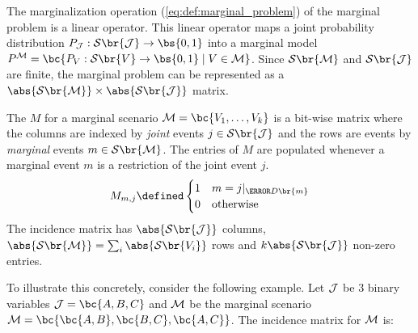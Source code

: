 \documentclass[aps, 10pt, english, twoside, pra, nofootinbib, tightenlines, longbibliography, superscriptaddress]{revtex4-1}
\renewcommand{\Events}[1]{\mathcal{S}\br{#1}} %
\begin{document}
    The marginalization operation (\cref{eq:def:marginal_problem}) of the marginal problem is a linear operator. This linear operator maps a joint probability distribution $\prob[\jointvar] : \Events{\jointvar} \to \bs{0,1}$ into a marginal model $\prob^{\mscenario} = \bc{\prob[V] : \Events{V} \to \bs{0,1} \mid V \in \mscenario}$. Since $\Events{\mscenario}$ and $\Events{\jointvar}$ are finite, the marginal problem can be represented as a $\abs{\Events{\mscenario}} \times \abs{\Events{\jointvar}}$ matrix.

    \begin{definition}
        \label{def:incidence_matrix}
        The  $M$ for a marginal scenario $\mscenario = \bc{V_1, \dots, V_k}$ is a bit-wise matrix where the columns are indexed by \textit{joint} events $j \in \Events{\jointvar}$ and the rows are events by \textit{marginal} events $m \in \Events{\mscenario}$. The entries of $M$ are populated whenever a marginal event $m$ is a restriction of the joint event $j$.
        \[ M_{m,j} \defined \begin{cases}
            1 & m = j|_{\s{D}\br{m}} \\
            0 & \text{otherwise}
        \end{cases} \]
        The incidence matrix has $\abs{\Events{\jointvar}}$ columns, $\abs{\Events{\mscenario}} = \sum_{i} \abs{\Events{V_i}}$ rows and $k\abs{\Events{\jointvar}}$ non-zero entries.
    \end{definition}
    To illustrate this concretely, consider the following example. Let $\mathcal{J}$ be $3$ binary variables $\jointvar = \bc{A,B,C}$ and $\mathcal{M}$ be the marginal scenario $\mscenario = \bc{\bc{A,B}, \bc{B,C}, \bc{A,C}}$. The incidence matrix for $\mathcal{M}$ is:
\end{document}
